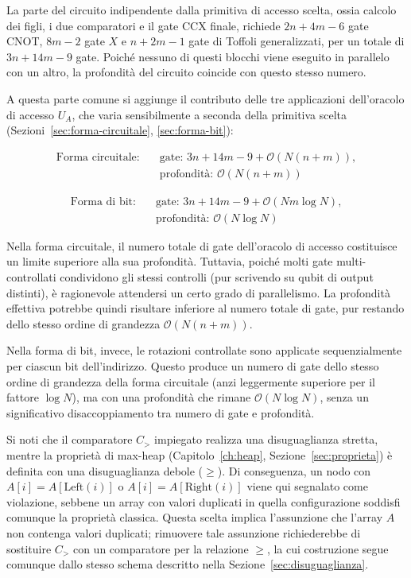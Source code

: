 La parte del circuito indipendente dalla primitiva di accesso scelta, ossia calcolo dei figli, i due comparatori e il gate CCX finale, richiede $2n+4m-6$ gate CNOT, $8m-2$ gate $X$ e $n+2m-1$ gate di Toffoli generalizzati, per un totale di $3n+14m-9$ gate. Poiché nessuno di questi blocchi viene eseguito in parallelo con un altro, la profondità del circuito coincide con questo stesso numero.

A questa parte comune si aggiunge il contributo delle tre applicazioni dell'oracolo di accesso $U_A$, che varia sensibilmente a seconda della primitiva scelta (Sezioni~\ref{sec:forma-circuitale}, \ref{sec:forma-bit}):

\begin{equation}
  \begin{aligned}
    \text{Forma circuitale:}
     & \quad \text{gate: } 3n+14m-9 + \mathcal{O}(N(n+m)), \\
     & \quad \text{profondità: } \mathcal{O}(N(n+m))
  \end{aligned}
\end{equation}

\begin{equation}
  \begin{aligned}
    \text{Forma di bit:}
     & \quad \text{gate: } 3n+14m-9 + \mathcal{O}(Nm\log N), \\
     & \quad \text{profondità: } \mathcal{O}(N\log N)
  \end{aligned}
\end{equation}

Nella forma circuitale, il numero totale di gate dell'oracolo di accesso costituisce un limite superiore alla sua profondità. Tuttavia, poiché molti gate multi-controllati condividono gli stessi controlli (pur scrivendo su qubit di output distinti), è ragionevole attendersi un certo grado di parallelismo. La profondità effettiva potrebbe quindi risultare inferiore al numero totale di gate, pur restando dello stesso ordine di grandezza $\mathcal{O}(N(n+m))$.

Nella forma di bit, invece, le rotazioni controllate sono applicate sequenzialmente per ciascun bit dell'indirizzo. Questo produce un numero di gate dello stesso ordine di grandezza della forma circuitale (anzi leggermente superiore per il fattore $\log N$), ma con una profondità che rimane $\mathcal{O}(N \log N)$, senza un significativo disaccoppiamento tra numero di gate e profondità.

Si noti che il comparatore $C_>$ impiegato realizza una disuguaglianza stretta, mentre la proprietà di max-heap (Capitolo~\ref{ch:heap}, Sezione~\ref{sec:proprieta}) è definita con una disuguaglianza debole ($\geq$). Di conseguenza, un nodo con $A[i]=A[\text{Left}(i)]$ o $A[i]=A[\text{Right}(i)]$ viene qui segnalato come violazione, sebbene un array con valori duplicati in quella configurazione soddisfi comunque la proprietà classica. Questa scelta implica l'assunzione che l'array $A$ non contenga valori duplicati; rimuovere tale assunzione richiederebbe di sostituire $C_>$ con un comparatore per la relazione $\geq$, la cui costruzione segue comunque dallo stesso schema descritto nella Sezione~\ref{sec:disuguaglianza}.

